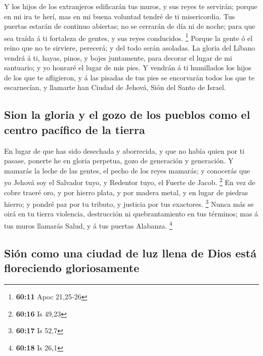  Y los hijos de los extranjeros edificarán tus muros, y sus
reyes te servirán; porque en mi ira te herí, mas en mi buena voluntad
tendré de ti misericordia.  Tus puertas estarán de continuo
abiertas; no se cerrarán de día ni de noche; para que sea traída á ti
fortaleza de gentes, y sus reyes conducidos. \footnote{\textbf{60:11}
  Apoc 21,25-26}  Porque la gente ó el reino que no te
sirviere, perecerá; y del todo serán asoladas.  La gloria
del Líbano vendrá á ti, hayas, pinos, y bojes juntamente, para decorar
el lugar de mi santuario; y yo honraré el lugar de mis pies.
 Y vendrán á ti humillados los hijos de los que te
afligieron, y á las pisadas de tus pies se encorvarán todos los que te
escarnecían, y llamarte han Ciudad de Jehová, Sión del Santo de Israel.

\hypertarget{sion-la-gloria-y-el-gozo-de-los-pueblos-como-el-centro-pacuxedfico-de-la-tierra}{%
\subsection{Sion la gloria y el gozo de los pueblos como el centro
pacífico de la
tierra}\label{sion-la-gloria-y-el-gozo-de-los-pueblos-como-el-centro-pacuxedfico-de-la-tierra}}

 En lugar de que has sido desechada y aborrecida, y que no
había quien por ti pasase, ponerte he en gloria perpetua, gozo de
generación y generación.  Y mamarás la leche de las gentes,
el pecho de los reyes mamarás; y conocerás que yo Jehová soy el Salvador
tuyo, y Redentor tuyo, el Fuerte de Jacob. \footnote{\textbf{60:16} Is
  49,23}  En vez de cobre traeré oro, y por hierro plata, y
por madera metal, y en lugar de piedras hierro; y pondré paz por tu
tributo, y justicia por tus exactores. \footnote{\textbf{60:17} Is 52,7}
 Nunca más se oirá en tu tierra violencia, destrucción ni
quebrantamiento en tus términos; mas á tus muros llamarás Salud, y á tus
puertas Alabanza. \footnote{\textbf{60:18} Is 26,1}

\hypertarget{siuxf3n-como-una-ciudad-de-luz-llena-de-dios-estuxe1-floreciendo-gloriosamente}{%
\subsection{Sión como una ciudad de luz llena de Dios está floreciendo
gloriosamente}\label{siuxf3n-como-una-ciudad-de-luz-llena-de-dios-estuxe1-floreciendo-gloriosamente}}

